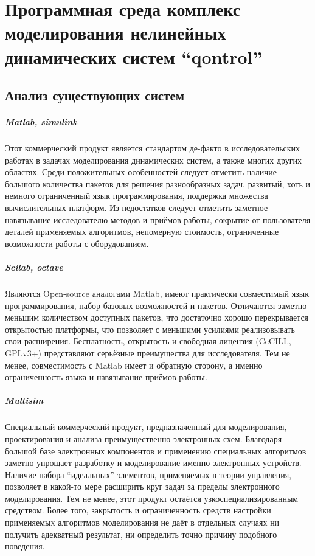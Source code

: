 \chapter{Программная среда комплекс моделирования нелинейных динамических систем ``qontrol''}
\label{chapter_qontrol}

\section{Анализ существующих систем} %

\paragraph{Matlab, simulink}

Этот коммерческий продукт является стандартом де-факто
в исследовательских работах в задачах моделирования динамических систем,
а также многих других областях. Среди положительных особенностей следует
отметить наличие большого количества пакетов для решения разнообразных задач,
развитый, хоть и немного ограниченный язык программирования, поддержка множества
вычислительных платформ. Из недостатков следует отметить заметное навязывание
исследователю методов и приёмов работы, сокрытие от пользователя деталей применяемых
алгоритмов, непомерную стоимость, ограниченные возможности работы с оборудованием.


\paragraph{Scilab, octave}

Являются Open-source аналогами Matlab, имеют практически совместимый язык программирования,
набор базовых возможностей и пакетов. Отличаются заметно меньшим количеством доступных
пакетов, что достаточно хорошо перекрывается открытостью платформы, что позволяет
с меньшими усилиями реализовывать свои расширения. Бесплатность, открытость
и свободная лицензия (CeCILL, GPLv3+) представляют серьёзные преимущества для
исследователя. Тем не менее, совместимость с Matlab имеет и обратную сторону,
а именно ограниченность языка и навязывание приёмов работы.

\paragraph{Multisim}

Специальный коммерческий продукт, предназначенный для моделирования, проектирования
и анализа преимущественно электронных схем. Благодаря большой базе электронных
компонентов и применению специальных алгоритмов заметно упрощает
разработку и моделирование именно электронных устройств. Наличие
набора ``идеальных'' элементов, применяемых в теории управления,
позволяет в какой-то мере расширить круг задач за пределы
электронного моделирования. Тем не менее, этот продукт остаётся
узкоспециализированным средством. Более того, закрытость и ограниченность средств настройки
применяемых алгоритмов моделирования не даёт в отдельных случаях
ни получить адекватный результат, ни определить точно причину подобного поведения.

